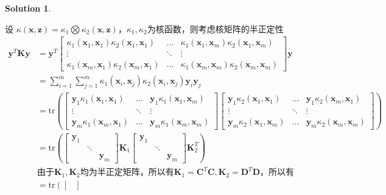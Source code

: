 \documentclass[a4paper,UTF8]{article}
\numberwithin{equation}{section}
\theoremstyle{definition}
\newtheorem*{solution}{Solution}
\newcommand{\bds}{\boldsymbol}
\def \y {\mathbf{y}}
\def \x {\mathbf{x}}
\def \z {\mathbf{z}}
\begin{document}
\begin{solution}
\begin{enumerate}
		设 $\kappa(\x,\z) = \kappa_1\bigotimes \kappa_2(\x,\z)$，$\kappa_1, \kappa_2$为核函数，则考虑核矩阵的半正定性
		\begin{align*}
			\y^T \mathbf{K} \y &= \y^T \begin{bmatrix}
				\kappa_1(\bds{x}_1, \bds{x}_1)\kappa_2(\bds{x}_1,\bds{x}_1) & \dots & \kappa_1(\bds{x}_1, \bds{x}_m)\kappa_2(\bds{x}_1,\bds{x}_m) \\
				\vdots & \ddots &\vdots \\
				\kappa_1(\bds{x}_m, \bds{x}_1)\kappa_2(\bds{x}_m,\bds{x}_1) & \dots & \kappa_1(\bds{x}_m, \bds{x}_m)\kappa_2(\bds{x}_m,\bds{x}_m)
			\end{bmatrix} \y \\
			&= \sum_{i=1}^{m}\sum_{j=1}^{m} \kappa_1(\bds{x}_i, \bds{x}_j)\kappa_2(\bds{x}_i,\bds{x}_j)\y_i\y_j \\
			&= \text{tr}\left( \begin{bmatrix}
				\y_1\kappa_1(\bds{x}_1, \bds{x}_1) & \dots & \y_1\kappa_1(\bds{x}_1, \bds{x}_m) \\
				\vdots & \ddots & \vdots \\
				\y_m\kappa_1(\bds{x}_m, \bds{x}_1) & \dots & \y_m\kappa_1(\bds{x}_m, \bds{x}_m) 
			\end{bmatrix} \begin{bmatrix}
				\y_1\kappa_2(\bds{x}_1, \bds{x}_1) & \dots & \y_1\kappa_2(\bds{x}_m, \bds{x}_1) \\
				\vdots & \ddots & \vdots \\
				\y_m\kappa_2(\bds{x}_1, \bds{x}_m) & \dots & \y_m\kappa_2(\bds{x}_m, \bds{x}_m)
			\end{bmatrix}  \right) \\
			&= \text{tr} \left( \begin{bmatrix}
				\y_1 & & \\
				& \ddots & \\
				& & \y_m
			\end{bmatrix} \mathbf{K}_1 \begin{bmatrix}
				\y_1 & & \\
				& \ddots & \\
				& & \y_m
			\end{bmatrix} \mathbf{K}_2^T \right) \\
			& \text{由于} \mathbf{K}_1, \mathbf{K}_2 \text{均为半正定矩阵，所以有} \mathbf{K}_1 = \mathbf{C}^T\mathbf{C}, \mathbf{K}_2 = \mathbf{D}^T\mathbf{D} \text{，所以有} \\
			&= \text{tr}\left( \begin{bmatrix}

\end{bmatrix}
\end{align*}
\end{enumerate}
\end{solution}
\end{document}
